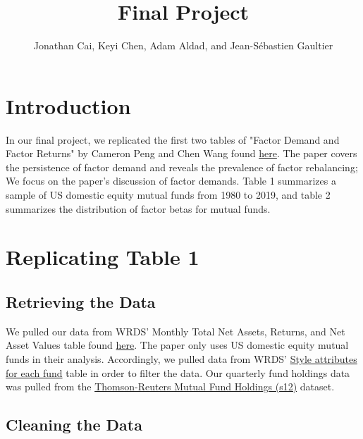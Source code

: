 \documentclass{article}
\title{Final Project}
\author{Jonathan Cai, Keyi Chen, Adam Aldad, and Jean-Sébastien Gaultier}
\begin{document}
\maketitle
 
\section{Introduction}


In our final project, we replicated the first two tables of "Factor Demand and Factor Returns" by Cameron Peng and Chen Wang 
found \href{https://papers.ssrn.com/sol3/papers.cfm?abstract_id=3327849}{here}. The paper covers the persistence of factor demand 
and reveals the prevalence of factor rebalancing; We focus on the paper's discussion of factor demands. Table 1 summarizes a sample
of US domestic equity mutual funds from 1980 to 2019, and table 2 summarizes the distribution of factor betas for mutual funds. 


\section{Replicating Table 1}


\subsection{Retrieving the Data}



We pulled our data from WRDS' Monthly Total Net Assets, Returns, and Net Asset Values table
found \href{https://wrds-www.wharton.upenn.edu/data-dictionary/crsp_q_mutualfunds/monthly_tna_ret_nav/}{here}. The paper 
only uses US domestic equity mutual funds in their analysis. Accordingly, we pulled data
from WRDS' \href{https://wrds-www.wharton.upenn.edu/data-dictionary/crsp_q_mutualfunds/fund_style/}{Style attributes for each fund} table in order to 
filter the data. Our quarterly fund holdings data was pulled from 
the \href{https://wrds-www.wharton.upenn.edu/data-dictionary/tr_mutualfunds/s12/}{Thomson-Reuters Mutual Fund Holdings (s12)} dataset.


\subsection{Cleaning the Data}
\end{document}
